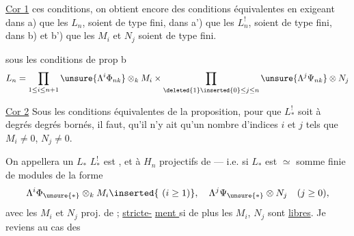 \uline{Cor 1}   ces conditions, on obtient encore
des conditions équivalentes en
exigeant  dans a) que les $L_n$, 
soient de type fini, dans a') que les
$L_n^!$,  soient de type fini, dans
b) et b') que les $M_i$ et $N_j$ soient de
type fini.

 sous les conditions de prop b
\[
L_n=\prod_{1\leq i\leq n+1}\unsure{\Lambda^i\Phi_{nk}}\otimes_k M_i
\times\prod_{\deleted{1}\inserted{0}\leq j\leq n}\unsure{\Lambda^j\Psi_{nk}}\otimes N_j
\]

\uline{Cor 2} Sous les conditions équivalentes de
la proposition, pour que $L^!_*$ soit à degrés
 degrés bornés, il faut,
qu'il n'y ait qu'un nombre  d'indices
$i$ et $j$ tels que $M_i\neq0$, $N_j\neq0$.

On appellera un $L_*$  
$L^!_*$ est , 
et à $H_n$ projectifs de  --- i.e.
si $L_*$ est $\simeq$ somme finie de
modules de la forme 
\[
\Lambda^i\Phi_{\unsure{*}}\otimes_k M_i\inserted{\ (i\geq1)},\quad
\Lambda^j\Psi_{\unsure{*}}\otimes N_j\quad(j\geq0),
\]
avec les $M_i$ et $N_j$ proj. de ; \uline{stricte-}
\uline{ment } si de plus les
$M_i$, $N_j$ sont \uline{libres}. Je reviens au cas des

